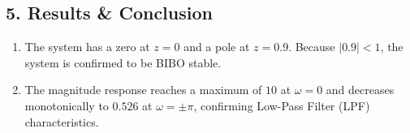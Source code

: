 \documentclass[11pt,a4paper]{article}
\begin{document}
\subsection*{5. Results \& Conclusion}
\begin{enumerate}
    \item The system has a zero at $z = 0$ and a pole at $z = 0.9$. Because $|0.9| < 1$, the system is confirmed to be BIBO stable.
    \item The magnitude response reaches a maximum of $10$ at $\omega = 0$ and decreases monotonically to $0.526$ at $\omega = \pm\pi$, confirming Low-Pass Filter (LPF) characteristics.
\end{enumerate}
\end{document}
